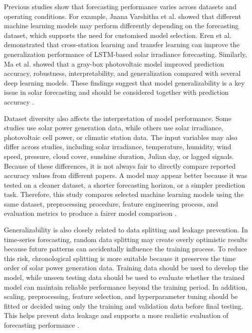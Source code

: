 Previous studies show that forecasting performance varies across datasets and operating conditions. For example, Jnana Varshitha et al. showed that different machine learning models may perform differently depending on the forecasting dataset, which supports the need for customised model selection. Eren et al. demonstrated that cross-station learning and transfer learning can improve the generalization performance of LSTM-based solar irradiance forecasting. Similarly, Ma et al. showed that a gray-box photovoltaic model improved prediction accuracy, robustness, interpretability, and generalization compared with several deep learning models. These findings suggest that model generalizability is a key issue in solar forecasting and should be considered together with prediction accuracy \parencite{JnanaVarshitha2025, Eren2025, Ma2025}.

Dataset diversity also affects the interpretation of model performance. Some studies use solar power generation data, while others use solar irradiance, photovoltaic cell power, or climatic station data. The input variables may also differ across studies, including solar irradiance, temperature, humidity, wind speed, pressure, cloud cover, sunshine duration, Julian day, or lagged signals. Because of these differences, it is not always fair to directly compare reported accuracy values from different papers. A model may appear better because it was tested on a cleaner dataset, a shorter forecasting horizon, or a simpler prediction task. Therefore, this study compares selected machine learning models using the same dataset, preprocessing procedure, feature engineering process, and evaluation metrics to produce a fairer model comparison \parencite{ArellanosTafur2025, CarvalhoJunior2025, Bakht2025}.

Generalizability is also closely related to data splitting and leakage prevention. In time-series forecasting, random data splitting may create overly optimistic results because future patterns can accidentally influence the training process. To reduce this risk, chronological splitting is more suitable because it preserves the time order of solar power generation data. Training data should be used to develop the model, while unseen testing data should be used to evaluate whether the trained model can maintain reliable performance beyond the training period. In addition, scaling, preprocessing, feature selection, and hyperparameter tuning should be fitted or decided using only the training and validation data before final testing. This helps prevent data leakage and supports a more realistic evaluation of forecasting performance \parencite{Eren2025, TsaiLo2025, Duvuru2026}.

